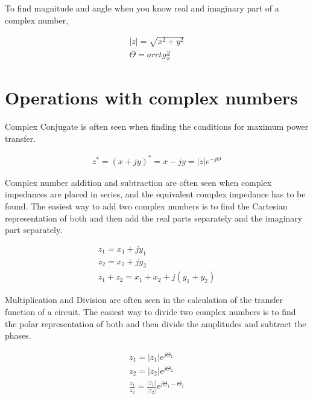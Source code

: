 \documentclass{ximera}
\begin{document}
  
 
  
  To find magnitude and angle when you know real and imaginary part of a complex number, 

\begin{eqnarray}
|z|=\sqrt{x^2+y^2} \\
\Theta = arctg \frac{y}{x}
\end{eqnarray}

\section{Operations with complex numbers}

 Complex Conjugate is often seen when finding the conditions for maximum power transfer.

\begin{eqnarray}
z^* = (x+ j y)^* = x- j y = |z| e^{-j \Theta}
\end{eqnarray}


 Complex number addition and subtraction are often seen when complex impedances are placed in series, and the equivalent complex impedance has to be found. The easiest way to add two complex numbers is to find the Cartesian representation of both and then add the real parts separately and the imaginary part separately.

\begin{eqnarray}
z_1=x_1 + j y_1 \\
z_2=x_2 + j y_2 \\
z_1+z_2 = x_1 + x_2 + j ( y_1 + y_2)
\end{eqnarray}

Multiplication and Division are often seen in the calculation of the transfer function of a circuit. The easiest way to divide two complex numbers is to find the polar representation of both and then divide the amplitudes and subtract the phases.

\begin{eqnarray}
z_1=|z_1| e^{j \Theta_1} \\
z_2=|z_2| e^{j \Theta_2} \\
\frac{z_1}{ z_2} = \frac{|z_1|}{|z_2|} e^{j \Theta_1 -\Theta_2}
\end{eqnarray}
  


 
\end{document}

